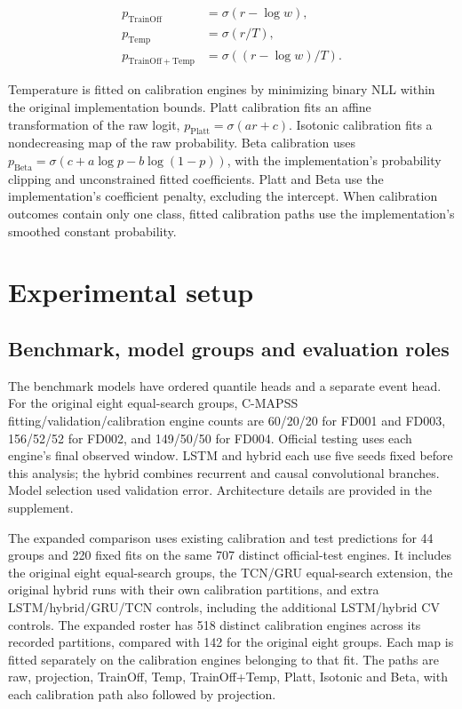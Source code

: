\documentclass[IJPHM, 2026, 0]{phmsociety}
\begin{document}
\begin{equation}
\begin{aligned}
p_{\mathrm{TrainOff}}&=\sigma(r-\log w),\\
p_{\mathrm{Temp}}&=\sigma(r/T),\\
p_{\mathrm{TrainOff+Temp}}&=\sigma((r-\log w)/T).
\end{aligned}
\end{equation}

Temperature is fitted on calibration engines by minimizing binary NLL within the original implementation bounds. Platt calibration fits an affine transformation of the raw logit, \(p_{\mathrm{Platt}}=\sigma(a r+c)\). Isotonic calibration fits a nondecreasing map of the raw probability. Beta calibration uses \(p_{\mathrm{Beta}}=\sigma(c+a\log p-b\log(1-p))\), with the implementation's probability clipping and unconstrained fitted coefficients. Platt and Beta use the implementation's coefficient penalty, excluding the intercept. When calibration outcomes contain only one class, fitted calibration paths use the implementation's smoothed constant probability.

\section{Experimental setup}

\subsection{Benchmark, model groups and evaluation roles}\label{benchmark-model-groups-and-evaluation-roles}

The benchmark models have ordered quantile heads and a separate event head. For the original eight equal-search groups, C-MAPSS fitting/validation/calibration engine counts are \mbox{60}/\mbox{20}/\mbox{20} for FD001 and FD003, \mbox{156}/\mbox{52}/\mbox{52} for FD002, and \mbox{149}/\mbox{50}/\mbox{50} for FD004. Official testing uses each engine's final observed window. LSTM and hybrid each use five seeds fixed before this analysis; the hybrid combines recurrent and causal convolutional branches. Model selection used validation error. Architecture details are provided in the supplement.

The expanded comparison uses existing calibration and test predictions for \mbox{44} groups and \mbox{220} fixed fits on the same \mbox{707} distinct official-test engines. It includes the original eight equal-search groups, the TCN/GRU equal-search extension, the original hybrid runs with their own calibration partitions, and extra LSTM/hybrid/GRU/TCN controls, including the additional LSTM/hybrid CV controls. The expanded roster has \mbox{518} distinct calibration engines across its recorded partitions, compared with \mbox{142} for the original eight groups. Each map is fitted separately on the calibration engines belonging to that fit. The paths are raw, projection, TrainOff, Temp, TrainOff+Temp, Platt, Isotonic and Beta, with each calibration path also followed by projection.
\end{document}

